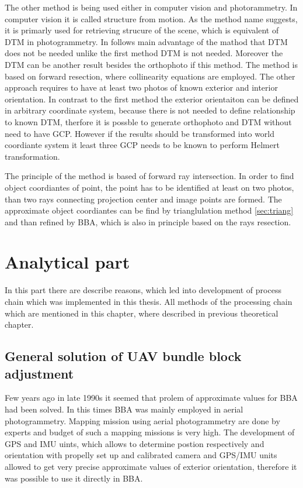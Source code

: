 \documentclass[a4paper,12pt]{report}
\begin{document}
\begin{itemize}
The other method is being used either in computer vision and photorammetry. In computer vision 
it is called structure from motion. As the method name suggests, it is primarly used for retrieving
strucure of the scene, which is equivalent of DTM in photogrammetry. In follows main advantage 
of the mathod that DTM does not be needed unlike the first method DTM is not needed. Moreover 
the DTM can be another result besides the orthophoto if this method. The method is based 
on forward resection, where collinearity equations are employed. The other approach requires to have at least
two photos of known exterior and interior orientation. In contrast to the first method the exterior orientaiton
can be defined in arbitrary coordinate system, because there is not needed to define relationship to 
known DTM, therfore it is possble to generate orthophoto and DTM without need to have GCP. However 
if the results should be transformed into world coordiante system it least three GCP needs to be known
to perform Helmert transformation. 

The principle of the method is based of forward ray intersection. In order to find object coordiantes
of point, the point has to be identified at least on two photos, than two rays connecting projection 
center and image points are formed. The approximate object coordiantes can be find by trianglulation 
method \ref{sec:triang} and than refined by BBA, which is also in principle based on the rays 
resection.
 

\chapter{Analytical part}

In this part there are describe reasons, which led into development of process chain which was implemented in 
this thesis. All methods of the processing chain which are mentioned in this chapter, where described in 
previous theoretical chapter.

\section{General solution of UAV bundle block adjustment}


Few years ago in late 1990s it seemed that prolem of approximate values for BBA had been solved. 
In this times BBA was mainly employed in aerial photogrammetry. Mapping mission using aerial 
photogrammetry are done by experts and budget of such a mapping missions is very high. 
The development of GPS and IMU uints, which allows to determine 
postion respectively and orientation with propelly set up and calibrated camera and GPS/IMU 
units allowed to get very precise approximate values of exterior orientation, therefore 
it was possible to use it directly in BBA.


\end{itemize}
\end{document}
